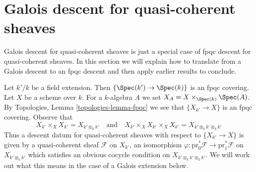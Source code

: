 \section{Galois descent for quasi-coherent sheaves}
\label{descent-section-galois-descent}
Galois descent for quasi-coherent sheaves is just a special
case of fpqc descent for quasi-coherent sheaves. In this section
we will explain how to translate from a Galois descent to
an fpqc descent and then apply earlier results to conclude.

\medskip\noindent
Let $k'/k$ be a field extension. Then $\{\Spec(k') \to \Spec(k)\}$
is an fpqc covering. Let $X$ be a scheme over $k$. For a $k$-algebra
$A$ we set $X_A = X \times_{\Spec(k)} \Spec(A)$. By
Topologies, Lemma \ref{topologies-lemma-fpqc}
we see that $\{X_{k'} \to X\}$ is an fpqc covering. Observe that
$$
X_{k'} \times_X X_{k'} = X_{k' \otimes_k k'}
\quad\text{and}\quad
X_{k'} \times_X X_{k'} \times_X X_{k'} = X_{k' \otimes_k k' \otimes_k k'}
$$
Thus a descent datum for quasi-coherent sheaves with respect to
$\{X_{k'} \to X\}$ is given by a quasi-coherent sheaf $\mathcal{F}$
on $X_{k'}$, an isomorphism
$\varphi : \text{pr}_0^*\mathcal{F} \to \text{pr}_1^*\mathcal{F}$
on $X_{k' \otimes_k k'}$
which satisfies an obvious cocycle condition on
$X_{k' \otimes_k k' \otimes_k k'}$.
We will work out what this means in the case of a Galois extension below.

